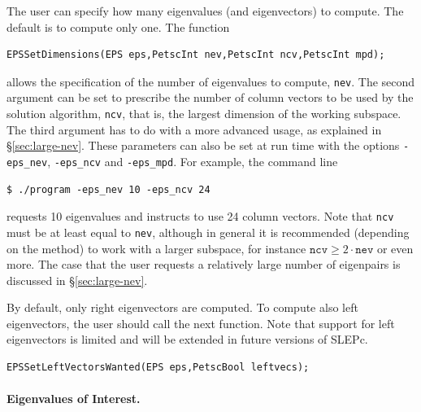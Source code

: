 	The user can specify how many eigenvalues (and eigenvectors) to compute. The default is to compute only one. The function
	\begin{Verbatim}[fontsize=\small]
	EPSSetDimensions(EPS eps,PetscInt nev,PetscInt ncv,PetscInt mpd);
	\end{Verbatim}
allows the specification of the number of eigenvalues to compute, \texttt{nev}. The second argument can be set to prescribe the number of column vectors to be used by the solution algorithm, \texttt{ncv}, that is, the largest dimension of the working subspace. The third argument has to do with a more advanced usage, as explained in \S\ref{sec:large-nev}. These parameters can also be set at run time with the options \Verb!-eps_nev!, \Verb!-eps_ncv! and \Verb!-eps_mpd!. For example, the command line
\begin{Verbatim}[fontsize=\small]
	$ ./program -eps_nev 10 -eps_ncv 24
\end{Verbatim}
requests 10 eigenvalues and instructs to use 24 column vectors. Note that \texttt{ncv} must be at least equal to \texttt{nev}, although in general it is recommended (depending on the method) to work with a larger subspace, for instance $\mathtt{ncv}\geq2\cdot\mathtt{nev}$ or even more. The case that the user requests a relatively large number of eigenpairs is discussed in \S\ref{sec:large-nev}.

	By default, only right eigenvectors are computed. To compute also left eigenvectors, the user should call the next function. Note that support for left eigenvectors is limited and will be extended in future versions of SLEPc.
	\begin{Verbatim}[fontsize=\small]
	EPSSetLeftVectorsWanted(EPS eps,PetscBool leftvecs);
	\end{Verbatim}

\paragraph{Eigenvalues of Interest.}

